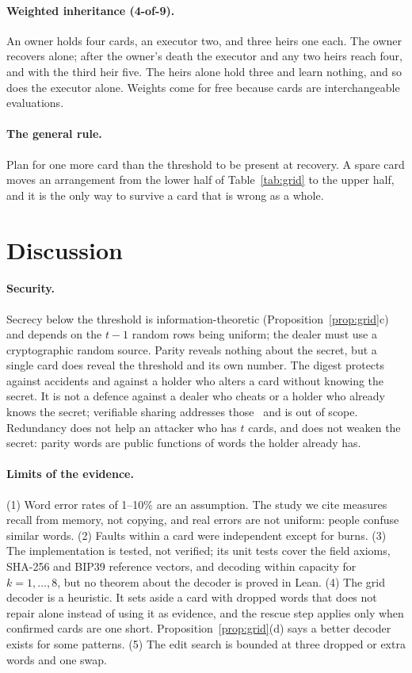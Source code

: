 \documentclass[numeric]{anvil-paper}
\begin{document}
\paragraph{Weighted inheritance (4-of-9).}
An owner holds four cards, an executor two, and three heirs one each. The owner
recovers alone; after the owner's death the executor and any two heirs reach
four, and with the third heir five. The heirs alone hold three and learn
nothing, and so does the executor alone. Weights come for free because cards
are interchangeable evaluations.

\paragraph{The general rule.}
Plan for one more card than the threshold to be present at recovery. A spare
card moves an arrangement from the lower half of Table~\ref{tab:grid} to the
upper half, and it is the only way to survive a card that is wrong as a whole.

\section{Discussion}
\label{sec:limits}

\paragraph{Security.}
Secrecy below the threshold is information-theoretic
(Proposition~\ref{prop:grid}c) and depends on the $t-1$ random rows being
uniform; the dealer must use a cryptographic random source. Parity reveals
nothing about the secret, but a single card does reveal the threshold and its
own number. The digest protects against accidents and against a holder who
alters a card without knowing the secret. It is not a defence against a dealer
who cheats or a holder who already knows the secret; verifiable sharing
addresses those~\citep{rabin1989verifiable} and is out of scope. Redundancy
does not help an attacker who has $t$ cards, and does not weaken the secret:
parity words are public functions of words the holder already has.

\paragraph{Limits of the evidence.}
(1) Word error rates of 1--10\% are an assumption. The study we cite measures
recall from memory, not copying, and real errors are not uniform: people
confuse similar words. (2) Faults within a card were independent except for
burns. (3) The implementation is tested, not verified; its unit tests cover
the field axioms, SHA-256 and BIP39 reference vectors, and decoding within
capacity for $k=1,\dots,8$, but no theorem about the decoder is proved in
Lean. (4) The grid decoder is a heuristic. It sets aside a card with dropped
words that does not repair alone instead of using it as evidence, and the
rescue step applies only when confirmed cards are one short.
Proposition~\ref{prop:grid}(d) says a better decoder exists for some
patterns. (5) The edit search is bounded at three dropped or extra words and
one swap.
\end{document}
